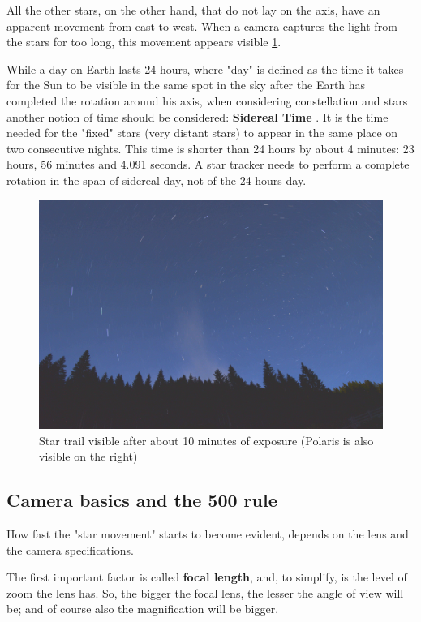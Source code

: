 \documentclass[]{article}
\begin{document}
All the other stars, on the other hand, that do not lay on the axis, have an apparent movement from east to west. When a camera captures the light from the stars for too long, this movement appears visible \ref{fig:startrail1}. 

While a day on Earth lasts 24 hours, where "day" is defined as the time it takes for the Sun to be visible in the same spot in the sky after the Earth has completed the rotation around his axis, when considering constellation and stars another notion of time should be considered: \textbf{Sidereal Time} \cite{cosmos}. It is the time needed for the "fixed" stars (very distant stars) to appear in the same place on two consecutive nights. This time is shorter than 24 hours by about 4 minutes: 23 hours, 56 minutes and 4.091 seconds. A star tracker needs to perform a complete rotation in the span of sidereal day, not of the 24 hours day. 

\begin{figure}[H]
	\centering
	\includegraphics[width=0.7\linewidth]{images/background/startrail}
	\caption{Star trail visible after about 10 minutes of exposure (Polaris is also visible on the right)}
	\label{fig:startrail1}
\end{figure}

\vspace{1em}

\subsection{Camera basics and the 500 rule}
How fast the "star movement" starts to become evident, depends on the lens and the camera specifications. 

The first important factor is called \textbf{focal length}, and, to simplify, is the level of zoom the lens has. So, the bigger the focal lens, the lesser the angle of view will be; and of course also the magnification will be bigger. 
\end{document}
